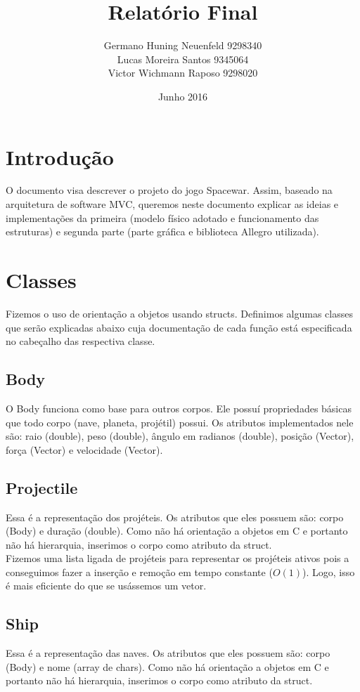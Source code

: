 \documentclass{article}
\title{Relatório Final}
\author{
    Germano Huning Neuenfeld 9298340
    \\
    Lucas Moreira Santos 9345064
    \\
    Victor Wichmann Raposo 9298020
}
\date{Junho 2016}
\begin{document}
\maketitle
\section{Introdução}
O documento visa descrever o projeto do jogo Spacewar. Assim, baseado na arquitetura de software MVC, queremos neste documento explicar as ideias e implementações
da primeira (modelo físico adotado e funcionamento das estruturas) e segunda parte (parte gráfica e biblioteca Allegro utilizada).

\section{Classes}
Fizemos o uso de orientação a objetos usando structs. Definimos algumas classes que serão explicadas abaixo
cuja documentação de cada função está especificada no cabeçalho das respectiva classe.

\subsection{Body}
O Body funciona como base para outros corpos. Ele possuí propriedades básicas que todo corpo (nave, planeta, projétil) possui.
Os atributos implementados nele são: raio (double), peso (double), ângulo em radianos (double), posição (Vector), força (Vector) e velocidade (Vector).

\subsection{Projectile}
Essa é a representação dos projéteis. Os atributos que eles possuem são: corpo (Body) e duração (double).
Como não há orientação a objetos em C e portanto não há hierarquia, inserimos o corpo como atributo da struct.\\
Fizemos uma lista ligada de projéteis para representar os projéteis ativos pois a conseguimos fazer a inserção e remoção em tempo constante ($O(1)$).
Logo, isso é mais eficiente do que se usássemos um vetor.

\subsection{Ship}
Essa é a representação das naves. Os atributos que eles possuem são: corpo (Body) e nome (array de chars).
Como não há orientação a objetos em C e portanto não há hierarquia, inserimos o corpo como atributo da struct.
\end{document}

